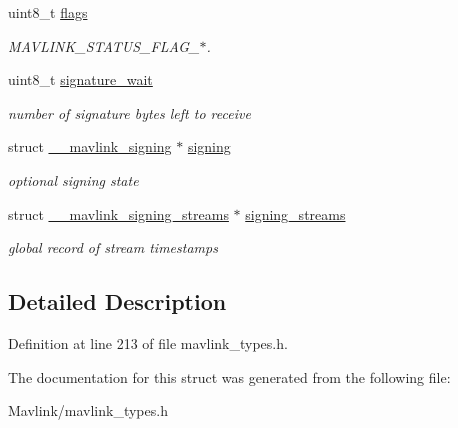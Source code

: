 \begin{DoxyCompactItemize}
uint8\+\_\+t \hyperlink{struct____mavlink__status_a2b67d268b29712b9607d1796228a77a2}{flags}
\begin{DoxyCompactList}\small\item\em M\+A\+V\+L\+I\+N\+K\+\_\+\+S\+T\+A\+T\+U\+S\+\_\+\+F\+L\+A\+G\+\_\+$\ast$. \end{DoxyCompactList}\item 
\hypertarget{struct____mavlink__status_afbdd26652864ceeccf1155287752496c}{}\label{struct____mavlink__status_afbdd26652864ceeccf1155287752496c} 
uint8\+\_\+t \hyperlink{struct____mavlink__status_afbdd26652864ceeccf1155287752496c}{signature\+\_\+wait}
\begin{DoxyCompactList}\small\item\em number of signature bytes left to receive \end{DoxyCompactList}\item 
\hypertarget{struct____mavlink__status_a12ca1a2ade1b6b83d87a8cd7553884a9}{}\label{struct____mavlink__status_a12ca1a2ade1b6b83d87a8cd7553884a9} 
struct \hyperlink{struct____mavlink__signing}{\+\_\+\+\_\+mavlink\+\_\+signing} $\ast$ \hyperlink{struct____mavlink__status_a12ca1a2ade1b6b83d87a8cd7553884a9}{signing}
\begin{DoxyCompactList}\small\item\em optional signing state \end{DoxyCompactList}\item 
\hypertarget{struct____mavlink__status_ab0e29fe56be92a4bbd722529ac76bd84}{}\label{struct____mavlink__status_ab0e29fe56be92a4bbd722529ac76bd84} 
struct \hyperlink{struct____mavlink__signing__streams}{\+\_\+\+\_\+mavlink\+\_\+signing\+\_\+streams} $\ast$ \hyperlink{struct____mavlink__status_ab0e29fe56be92a4bbd722529ac76bd84}{signing\+\_\+streams}
\begin{DoxyCompactList}\small\item\em global record of stream timestamps \end{DoxyCompactList}\end{DoxyCompactItemize}


\subsection{Detailed Description}


Definition at line 213 of file mavlink\+\_\+types.\+h.



The documentation for this struct was generated from the following file\+:\begin{DoxyCompactItemize}
\item 
Mavlink/mavlink\+\_\+types.\+h\end{DoxyCompactItemize}
